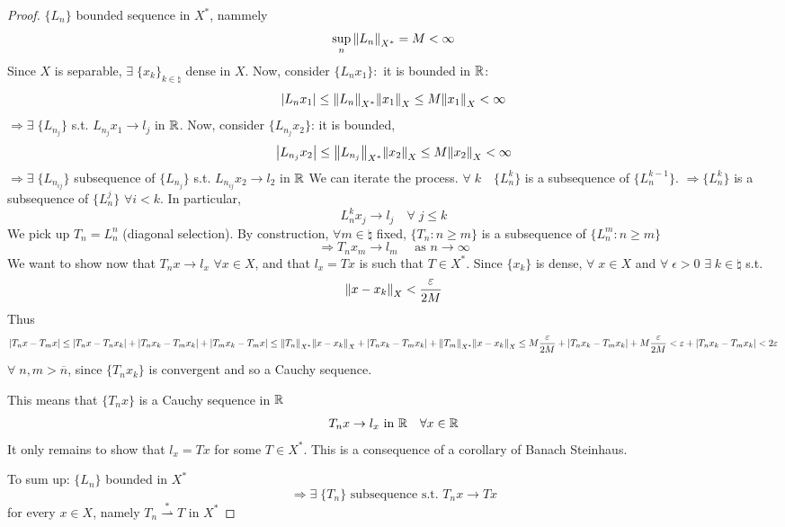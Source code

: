 \begin{proof}
    \(\{L_n\}\) bounded sequence in \(X^*\), nammely
    \[
        \sup_{n} \norm{L_n}_{X^*} = M < \infty
    \]
    Since \(X\) is separable, \(\exists \; \{x_k\}_{k \in \natural}\) dense in \(X\). 
    Now, consider \(\{L_n x_1\}:\) it is bounded in \(\mathbb{R}\):
    \[
        \abs{L_n x_1} \leq \norm{L_n}_{X^*} \norm{x_1}_X \leq M \norm{x_1}_X < \infty
    \]
    \(\Rightarrow \exists \; \{L_{n_j}\}\) s.t. \(L_{n_j} x_1 \to l_j\) in \(\mathbb{R}\). Now, consider \(\{L_{n_j} x_2\}\): it is bounded,
    \[
        \abs{L_{n_j}x_2} \leq \norm{L_{n_j}}_{X^*} \norm{x_2}_X \leq M \norm{x_2}_X < \infty
    \]
    \(\Rightarrow \exists\; \{L_{n_{ij}}\}\) subsequence of \(\{L_{n_j}\}\) s.t. \( L_{n_{ij}} x_2 \to l_2\) in \(\mathbb{R}\)
    We can iterate the process. \(\forall \; k \quad \{L_n^k\}\) is a subsequence of \(\{L_n^{k-1}\}\). \(\Rightarrow \{L_n^k\}\) is a subsequence of \(\{L_n^j\}\) \(\forall i < k\). In particular, 
    \[
        L_n^k x_j \to l_j \quad \forall \; j \leq k
    \]
    We pick up \(T_n = L_n^n\) (diagonal selection). By construction, \(\forall m \in \natural\) fixed, \(\{T_n: n \geq m\}\) is a subsequence of \(\{L_n^m: n \geq m\}\) 
    \[
        \Rightarrow T_n x_m \to l_m \quad \text{ as } n \to \infty
    \]
    We want to show now that \(T_n x \to l_x\) \(\forall x \in X\), and that \(l_x = Tx\) is such that \(T \in X^*\). Since \(\{x_k\}\) is dense, \(\forall \; x \in X\) and \( \forall\; \epsilon >0\) \(\exists\; k \in \natural \) s.t. 
    \[
        \norm{x-x_k}_X < \frac{\varepsilon}{2M}
    \]
    Thus
    \[
        \abs{T_n x - T_m x} \leq \abs{T_n x - T_n x_k} + \abs{T_n x_k - T_m x_k} + \abs{T_m x_k - T_m x}
        \leq \norm{T_n}_{X^*} \norm{x -x_k}_X + \abs{T_n x_k - T_m x_k} + \norm{T_m}_{X^*} \norm{x -x_k}_X
        \leq M \frac{\varepsilon}{2M} + \abs{T_n x_k - T_m x_k} + M \frac{\varepsilon}{2M} 
        < \varepsilon + \abs{T_n x_k - T_m x_k} < 2 \varepsilon
    \]
    \(\forall \; n, m > \overline{n}\), since \(\{T_n x_k\}\) is convergent and so a Cauchy sequence.

    This means that \(\{T_n x\}\) is a Cauchy sequence in \(\mathbb{R}\)
    \[
        T_n x \to l_x \text{ in } \mathbb{R} \quad \forall x \in \mathbb{R}
    \]
    It only remains to show that \(l_x = Tx\) for some \(T \in X^*\). This is a consequence of a corollary of Banach Steinhaus.

    To sum up: \(\{L_n\}\) bounded in \(X^*\)
    \[
        \Rightarrow \exists \; \{T_n\} \text{ subsequence s.t. } T_n x \to Tx
    \]
    for every \(x \in X\), namely \(T_n \overset{*}{\rightharpoonup} T\) in \(X^*\)
\end{proof}


